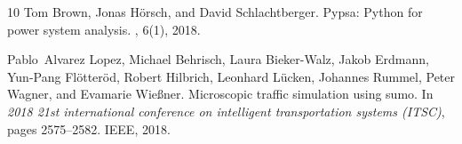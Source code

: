 \documentclass[sigconf]{acmart}
\begin{document}
\begin{thebibliography}{10}
Tom Brown, Jonas H{\"o}rsch, and David Schlachtberger.
\newblock Pypsa: Python for power system analysis.
, 6(1), 2018.

Pablo~Alvarez Lopez, Michael Behrisch, Laura Bieker-Walz, Jakob Erdmann, Yun-Pang Fl{\"o}tter{\"o}d, Robert Hilbrich, Leonhard L{\"u}cken, Johannes Rummel, Peter Wagner, and Evamarie Wie{\ss}ner.
\newblock Microscopic traffic simulation using sumo.
\newblock In {\em 2018 21st international conference on intelligent transportation systems (ITSC)}, pages 2575--2582. IEEE, 2018.

\end{thebibliography}
\end{document}

